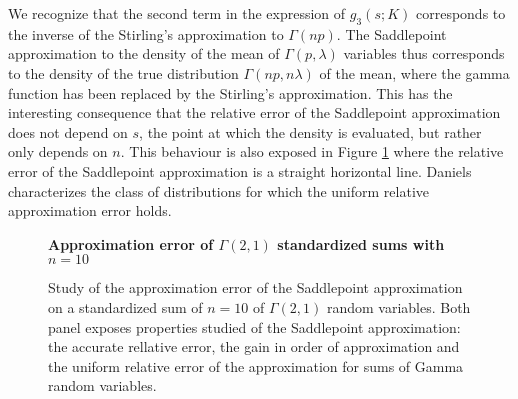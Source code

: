 \begin{example}
    We recognize that the second term in the expression of $g_3(s; K)$ corresponds to the inverse of the Stirling's approximation to $\Gamma(np)$. The Saddlepoint approximation to the density of the mean of $\Gamma(p, \lambda)$ variables thus corresponds to the density of the true distribution $\Gamma(np, n\lambda)$ of the mean, where the gamma function has been replaced by the Stirling's approximation. This has the interesting consequence that the relative error of the Saddlepoint approximation does not depend on $s$, the point at which the density is evaluated, but rather only depends on $n$. This behaviour is also exposed in Figure \ref{fig-saddlepoint-err} where the relative error of the Saddlepoint approximation is a straight horizontal line. Daniels \cite{daniels1954saddlepoint} characterizes the class of distributions for which the uniform relative approximation error holds.

    \begin{figure}[!htbp]
        \textbf{Approximation error of $\Gamma(2,1)$ standardized sums with $n=10$}
        \centering
        \caption{Study of the approximation error of the Saddlepoint approximation on a standardized sum of $n=10$ of $\Gamma(2, 1)$ random variables. Both panel exposes properties studied of the Saddlepoint approximation: the accurate rellative error, the gain in order of approximation and the uniform relative error of the approximation for sums of Gamma random variables.}
        \label{fig-saddlepoint-err}
    \end{figure}
    
\end{example}